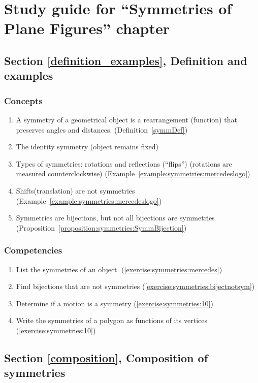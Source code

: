 \section{Study guide  for ``Symmetries of Plane Figures''  chapter}\label{sec:symmetries:study} 


\subsection*{Section \ref{definition_examples}, Definition and examples}
\subsubsection*{Concepts}
\begin{enumerate}
\item 
A symmetry of a geometrical object is a rearrangement (function) that preserves angles and distances. (Definition~\ref{symmDef})
\item
The identity symmetry (object remains fixed)
\item
Types of symmetries: rotations and reflections (``flips'')  (rotations are measured counterclockwise) (Example~\ref{example:symmetries:mercedeslogo})
\item
Shifts(translation) are not symmetries (Example~\ref{example:symmetries:mercedeslogo})
\item
Symmetries are bijections, but not all bijections are symmetries (Proposition~\ref{proposition:symmetries:SymmBijection})
\end{enumerate}

\subsubsection*{Competencies}
\begin{enumerate}
\item
List the symmetries of an object. (\ref{exercise:symmetries:mercedes})
\item
Find bijections that are not symmetries (\ref{exercise:symmetries:bijectnotsym})
\item
Determine if a motion is a symmetry (\ref{exercise:symmetries:10})
\item
Write the symmetries of a polygon as functions of its vertices (\ref{exercise:symmetries:10})
\end{enumerate}


\subsection*{Section \ref{composition}, Composition of symmetries}
